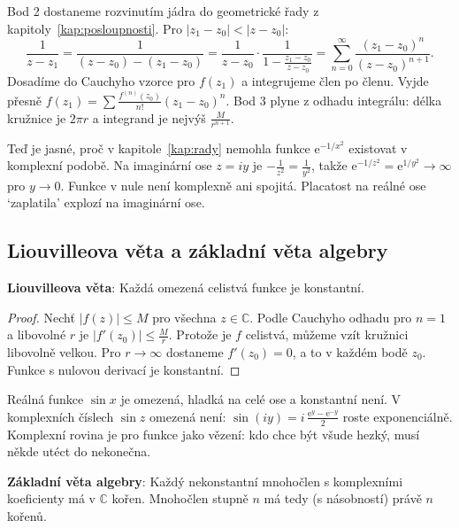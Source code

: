 Bod 2 dostaneme rozvinutím jádra do geometrické řady z kapitoly~\ref{kap:posloupnosti}. Pro $|z_1 - z_0| < |z - z_0|$:
\begin{equation*}
  \frac{1}{z - z_1} = \frac{1}{(z - z_0) - (z_1 - z_0)} = \frac{1}{z - z_0}\cdot\frac{1}{1 - \frac{z_1 - z_0}{z - z_0}} = \sum_{n=0}^{\infty}\frac{{(z_1 - z_0)}^n}{{(z - z_0)}^{n+1}}.
\end{equation*}
Dosadíme do Cauchyho vzorce pro $f(z_1)$ a integrujeme člen po členu. Vyjde přesně $f(z_1) = \sum\frac{f^{(n)}(z_0)}{n!}{(z_1 - z_0)}^n$. Bod 3 plyne z odhadu integrálu: délka kružnice je $2\pi r$ a integrand je nejvýš $\frac{M}{r^{n+1}}$.

Teď je jasné, proč v kapitole~\ref{kap:rady} nemohla funkce $\mathrm{e}^{-1/x^2}$ existovat v komplexní podobě. Na imaginární ose $z = iy$ je $-\frac{1}{z^2} = \frac{1}{y^2}$, takže $\mathrm{e}^{-1/z^2} = \mathrm{e}^{1/y^2}\to\infty$ pro $y\to 0$. Funkce v nule není komplexně ani spojitá. Placatost na reálné ose `zaplatila' explozí na imaginární ose.

\subsection{Liouvilleova věta a základní věta algebry}

\begin{definitionbox}
  \textbf{Liouvilleova věta}: Každá omezená celistvá funkce je konstantní.
\end{definitionbox}

\begin{proof}
  Nechť $|f(z)|\leq M$ pro všechna $z\in\mathbb{C}$. Podle Cauchyho odhadu pro $n = 1$ a libovolné $r$ je $|f'(z_0)|\leq\frac{M}{r}$. Protože je $f$ celistvá, můžeme vzít kružnici libovolně velkou. Pro $r\to\infty$ dostaneme $f'(z_0) = 0$, a to v každém bodě $z_0$. Funkce s nulovou derivací je konstantní.
\end{proof}

Reálná funkce $\sin x$ je omezená, hladká na celé ose a konstantní není. V komplexních číslech $\sin z$ omezená není: $\sin(iy) = i\,\frac{\mathrm{e}^y - \mathrm{e}^{-y}}{2}$ roste exponenciálně. Komplexní rovina je pro funkce jako vězení: kdo chce být všude hezký, musí někde utéct do nekonečna.

\begin{definitionbox}
  \textbf{Základní věta algebry}: Každý nekonstantní mnohočlen s komplexními koeficienty má v $\mathbb{C}$ kořen. Mnohočlen stupně $n$ má tedy (s násobností) právě $n$ kořenů.
\end{definitionbox}

